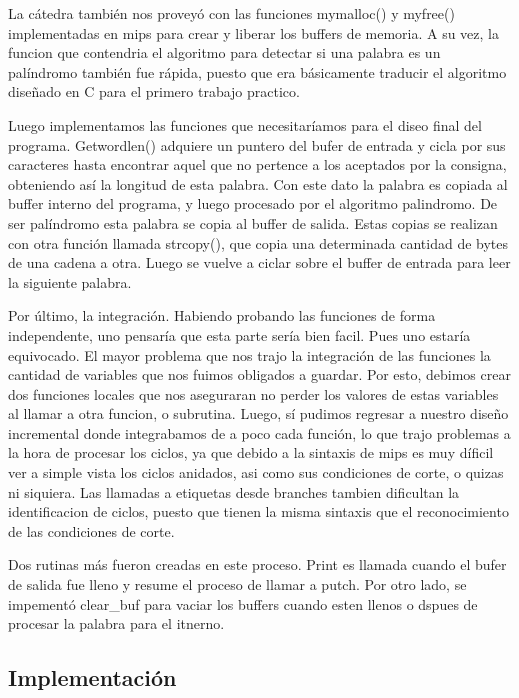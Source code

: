 \documentclass[10pt,a4paper]{article}
\begin{document}
La cátedra también nos proveyó con las funciones mymalloc() y myfree() implementadas en mips para crear y liberar los buffers de memoria. A su vez, la funcion que contendria el algoritmo para detectar si una palabra es un palíndromo también fue rápida, puesto que era básicamente traducir el algoritmo diseñado en C para el primero trabajo practico.

Luego implementamos las funciones que necesitaríamos para el diseo final del programa. Getwordlen() adquiere un puntero del bufer de entrada y cicla por sus caracteres hasta encontrar aquel que no pertence a los aceptados por la consigna, obteniendo así la longitud de esta palabra. Con este dato la palabra es copiada al buffer interno del programa, y luego procesado por el algoritmo palindromo. De ser palíndromo esta palabra se copia al buffer de salida. Estas copias se realizan con otra función llamada strcopy(), que copia una determinada cantidad de bytes de una cadena a otra. Luego se vuelve a ciclar sobre el buffer de entrada para leer la siguiente palabra.

Por último, la integración. Habiendo probando las funciones de forma independente, uno pensaría que esta parte sería bien facil. Pues uno estaría equivocado. El mayor problema que nos trajo la integración de las funciones la cantidad de variables que nos fuimos obligados a guardar. Por esto, debimos crear dos funciones locales que nos aseguraran no perder los valores de estas variables al llamar a otra funcion, o subrutina. Luego, sí pudimos regresar a nuestro diseño incremental donde integrabamos de a poco cada función, lo que trajo problemas a la hora de procesar los ciclos, ya que debido a la sintaxis de mips es muy díficil ver a simple vista los ciclos anidados, asi como sus condiciones de corte, o quizas ni siquiera. Las llamadas a etiquetas desde branches tambien dificultan la identificacion de ciclos, puesto que tienen la misma sintaxis que el reconocimiento de las condiciones de corte.

Dos rutinas más fueron creadas en este proceso. Print es llamada cuando el bufer de salida fue lleno y resume el proceso de llamar a putch. Por otro lado, se impementó clear_buf para vaciar los buffers cuando esten llenos o dspues de procesar la palabra para el itnerno.

\newpage

\subsection{Implementación}
\end{document}
